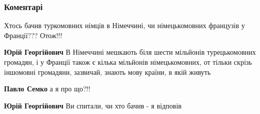  
 
 
 
 
\subsubsection{Коментарі}

\begin{itemize}
 
Хтось бачив туркомовних німців в Німеччині, чи німецькомовних французів у Франції??? Отож!!!

\begin{itemize}
 
\textbf{Юрій Георгійович} В Німеччині мешкають біля шести мільйонів
турецькомовних громадян, і у Франції також є кілька мільйонів німецькомовних,
от тільки скрізь іншомовні громадяни, зазвичай, знають мову країни, в якій
живуть

\begin{itemize}
 
\textbf{Павло Семко} а я про що?!!

 
\textbf{Юрій Георгійович} Ви спитали, чи хто бачив - я відповів

 

\end{itemize}
\end{itemize}
\end{itemize}
